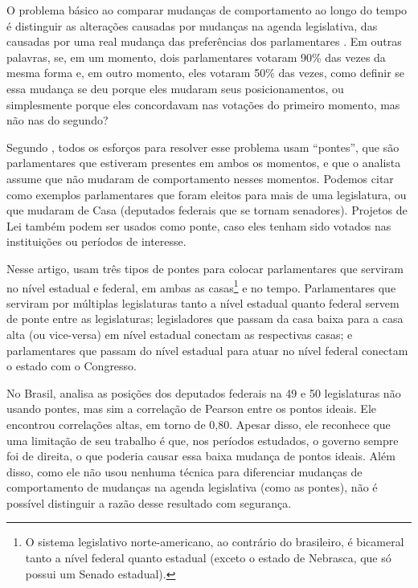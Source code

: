 O problema básico ao comparar mudanças de comportamento ao longo do tempo é
distinguir as alterações causadas por mudanças na agenda legislativa, das
causadas por uma real mudança das preferências dos parlamentares
\cite{Bailey2007}. Em outras palavras, se, em um momento, dois parlamentares
votaram 90\% das vezes da mesma forma e, em outro momento, eles votaram 50\% das
vezes, como definir se essa mudança se deu porque eles mudaram seus
posicionamentos, ou simplesmente porque eles concordavam nas votações do
primeiro momento, mas não nas do segundo?

Segundo , todos os esforços para resolver esse problema
usam ``pontes'', que são parlamentares que estiveram presentes em ambos os
momentos, e que o analista assume que não mudaram de comportamento nesses
momentos. Podemos citar como exemplos parlamentares que foram eleitos para mais
de uma legislatura, ou que mudaram de Casa (deputados federais que se tornam
senadores). Projetos de Lei também podem ser usados como ponte, caso eles
tenham sido votados nas instituições ou períodos de interesse.

Nesse artigo,  usam três tipos de pontes para colocar
parlamentares que serviram no nível estadual e federal, em ambas as
casas\footnote{O sistema legislativo norte-americano, ao contrário do
brasileiro, é bicameral tanto a nível federal quanto estadual (exceto o estado
de Nebrasca, que só possui um Senado estadual).} e no tempo. Parlamentares que
serviram por múltiplas legislaturas tanto a nível estadual quanto federal
servem de ponte entre as legislaturas; legisladores que passam da casa baixa
para a casa alta (ou vice-versa) em nível estadual conectam as respectivas
casas; e parlamentares que passam do nível estadual para atuar no nível
federal conectam o estado com o Congresso.

No Brasil,  analisa as posições dos deputados federais na
49\textordfeminine{} e 50\textordfeminine{} legislaturas não usando pontes, mas
sim a correlação de Pearson entre os pontos ideais. Ele encontrou correlações
altas, em torno de 0,80. Apesar disso, ele reconhece que uma limitação de seu
trabalho é que, nos períodos estudados, o governo sempre foi de direita, o que
poderia causar essa baixa mudança de pontos ideais. Além disso, como ele não
usou nenhuma técnica para diferenciar mudanças de comportamento de mudanças na
agenda legislativa (como as pontes), não é possível distinguir a razão desse
resultado com segurança.

